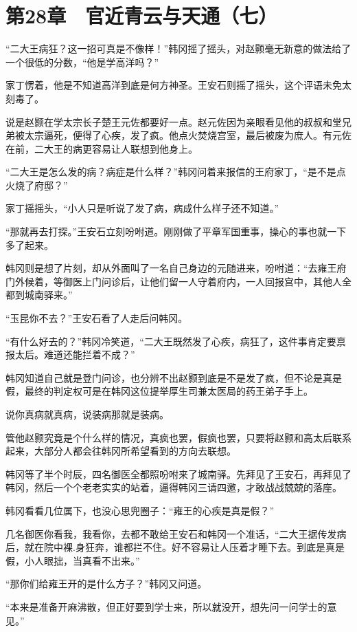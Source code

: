 \section{第28章　官近青云与天通（七）}

“二大王病狂？这一招可真是不像样！”韩冈摇了摇头，对赵颢毫无新意的做法给了一个很低的分数，“他是学高洋吗？”

家丁愣着，他是不知道高洋到底是何方神圣。王安石则摇了摇头，这个评语未免太刻毒了。

说是赵颢在学太宗长子楚王元佐都要好一点。赵元佐因为亲眼看见他的叔叔和堂兄弟被太宗逼死，便得了心疾，发了疯。他点火焚烧宫室，最后被废为庶人。有元佐在前，二大王的病更容易让人联想到他身上。

“二大王是怎么发的病？病症是什么样？”韩冈问着来报信的王府家丁，“是不是点火烧了府邸？”

家丁摇摇头，“小人只是听说了发了病，病成什么样子还不知道。”

“那就再去打探。”王安石立刻吩咐道。刚刚做了平章军国重事，操心的事也就一下多了起来。

韩冈则是想了片刻，却从外面叫了一名自己身边的元随进来，吩咐道：“去雍王府门外候着，等御医上门问诊后，让他们留一人守着府内，一人回报宫中，其他人全都到城南驿来。”

“玉昆你不去？”王安石看了人走后问韩冈。

“有什么好去的？”韩冈冷笑道，“二大王既然发了心疾，病狂了，这件事肯定要禀报太后。难道还能拦着不成？”

韩冈知道自己就是登门问诊，也分辨不出赵颢到底是不是发了疯，但不论是真是假，最终的判定权可是在韩冈这位提举厚生司兼太医局的药王弟子手上。

说你真病就真病，说装病那就是装病。

管他赵颢究竟是个什么样的情况，真疯也罢，假疯也罢，只要将赵颢和高太后联系起来，大部分人都会往韩冈所希望看到的方向去联想。

韩冈等了半个时辰，四名御医全都照吩咐来了城南驿。先拜见了王安石，再拜见了韩冈，然后一个个老老实实的站着，逼得韩冈三请四邀，才敢战战兢兢的落座。

韩冈看看几位属下，也没心思兜圈子：“雍王的心疾是真是假？”

几名御医你看我，我看你，去都不敢给王安石和韩冈一个准话，“二大王据传发病后，就在院中裸.身狂奔，谁都拦不住。好不容易让人压着才睡下去。到底是真是假，小人眼拙，当真看不出来。”

“那你们给雍王开的是什么方子？”韩冈又问道。

“本来是准备开麻沸散，但正好要到学士来，所以就没开，想先问一问学士的意见。”

